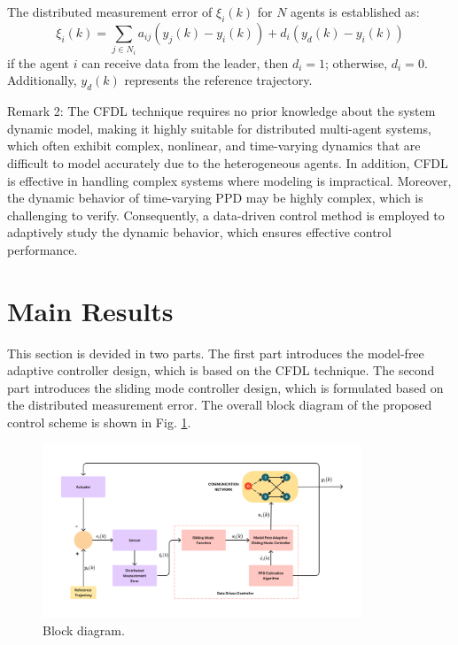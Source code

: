 \documentclass[journal,onecolumn]{IEEEtran}
\begin{document}
The distributed measurement error of \(\xi_i(k)\) for $N$ agents is established as:
\begin{equation}
    \label{model 3}
    \xi_i(k) = \sum_{j \in N_i} a_{ij}( y_j(k)-y_i(k)) + d_i(y_d(k) - y_i(k ))
\end{equation}
if the agent $ i $ can receive data from the leader, then $d_i=1$; otherwise, $d_i=0$. Additionally, $y_d(k)$ represents the reference trajectory. 

Remark 2: The CFDL technique requires no prior knowledge about the system dynamic model, making it highly suitable for distributed multi-agent systems, which often exhibit complex, nonlinear, and time-varying dynamics that are difficult to model accurately due to the heterogeneous agents. In addition, CFDL is effective in handling complex systems where modeling is impractical. Moreover, the dynamic behavior of time-varying PPD may be highly complex, which is challenging to verify. Consequently, a data-driven control method is employed to adaptively study the dynamic behavior, which ensures effective control performance.
 

\section{Main Results}

This section is devided in two parts. The first part introduces the model-free adaptive controller design, which is based on the CFDL technique. The second part introduces the sliding mode controller design, which is formulated based on the distributed measurement error. The overall block diagram of the proposed control scheme is shown in Fig. \ref{fig:diagram}.
\begin{figure}[H]
    \centering
    \includegraphics[width=0.85\textwidth]{diagram.png}
    \caption{Block diagram.}
    \label{fig:diagram} %
\end{figure}
\end{document}
